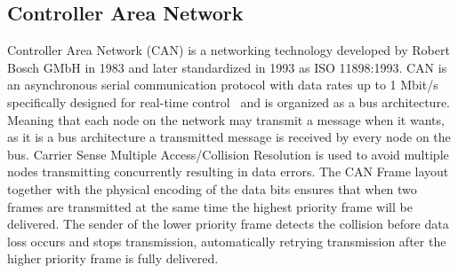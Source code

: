 \subsection{Controller Area Network}
\label{sec:can}
Controller Area Network (CAN) is a networking technology developed by Robert Bosch GMbH in 1983 and later standardized in 1993 as ISO 11898:1993. CAN is an asynchronous serial communication protocol with data rates up to 1 Mbit/s specifically designed for real-time control~\cite{ISO11898} and is organized as a bus architecture. Meaning that each node on the network may transmit a message when it wants, as it is a bus architecture a transmitted message is received by every node on the bus. Carrier Sense Multiple Access/Collision Resolution is used to avoid multiple nodes transmitting concurrently resulting in data errors. The CAN Frame layout together with the physical encoding of the data bits ensures that when two frames are transmitted at the same time the highest priority frame will be delivered. The sender of the lower priority frame detects the collision before data loss occurs and stops transmission, automatically retrying transmission after the higher priority frame is fully delivered. 

